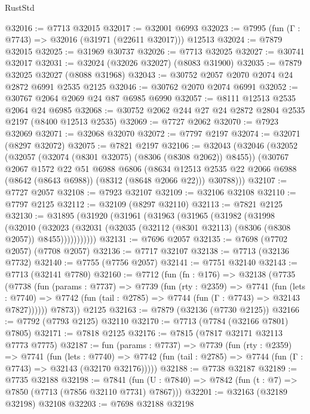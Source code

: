 \begin{lexlean}{RustStd}
\begin{coremodule}
@32016 := @7713 @32015
@32017 := @32001 @6993
@32023 := @7995 (fun (Γ : @7743) => @32016 (@31971 (@22611 @32017))) @12513
@32024 := @7879 @32015
@32025 := @31969 @30737
@32026 := @7713 @32025
@32027 := @30741 @32017
@32031 := @32024 (@32026 @32027) (@8083 @31900)
@32035 := @7879 @32025 @32027 (@8088 @31968)
@32043 := @30752 @2057 @2070 @2074 @24 @2872 @6991 @2535 @2125
@32046 := @30762 @2070 @2074 @6991
@32052 := @30767 @2064 @2069 @24 @87 @6985 @6990
@32057 := @8111 @12513 @2535 @2064 @24 @6985
@32068 := @30752 @2062 @244 @27 @24 @2872 @2804 @2535 @2197 (@8400 @12513 @2535)
@32069 := @7727 @2062
@32070 := @7923 @32069
@32071 := @32068 @32070
@32072 := @7797 @2197
@32074 := @32071 (@8297 @32072)
@32075 := @7821 @2197
@32106 := @32043
    (@32046
      (@32052
        (@32057 (@32074 (@8301 @32075) (@8306 (@8308 @2062)) @8455))
        (@30767
          @2067
          @1572
          @22
          @51
          @6988
          @6806
          (@8634 @12513 @2535 @22 @2066 @6988 (@8642 (@8643 @6988)) (@8312 (@8648 @2066 @22)))
          @30788)))
@32107 := @7727 @2057
@32108 := @7923 @32107
@32109 := @32106 @32108
@32110 := @7797 @2125
@32112 := @32109 (@8297 @32110)
@32113 := @7821 @2125
@32130 := @31895
    (@31920
      (@31961
        (@31963
          (@31965
            (@31982
              (@31998
                (@32010
                  (@32023
                    (@32031 (@32035 (@32112 (@8301 @32113) (@8306 (@8308 @2057)) @8455)))))))))))
@32131 := @7696 @2057
@32135 := @7698 (@7702 @2057) (@7708 @2057)
@32136 := @7717 @32107
@32138 := @7713 (@32136 @7732)
@32140 := @7755 (@7756 @2057)
@32141 := @7751 @32140
@32143 := @7713 (@32141 @7780)
@32160 := @7712
    (fun (fn : @176) =>
    @32138
      (@7735
        (@7738
          (fun (params : @7737) =>
          @7739
            (fun (rty : @2359) =>
            @7741
              (fun (lets : @7740) =>
              @7742 (fun (tail : @2785) => @7744 (fun (Γ : @7743) => @32143 @7827))))))
        @7873))
    @2125
@32163 := @7879 (@32136 (@7730 @2125))
@32166 := @7792 (@7793 @2125) @32110
@32170 := @7713 (@7784 (@32166 @7801) @7805)
@32171 := @7818 @2125
@32176 := @7815 (@7817 @32171 @32113 @7773 @7775)
@32187 := fun (params : @7737) =>
  @7739
    (fun (rty : @2359) =>
    @7741
      (fun (lets : @7740) =>
      @7742 (fun (tail : @2785) => @7744 (fun (Γ : @7743) => @32143 (@32170 @32176)))))
@32188 := @7738 @32187
@32189 := @7735 @32188
@32198 := @7841
    (fun (U : @7840) => @7842 (fun (t : @7) => @7850 (@7713 (@7856 @32110 @7731) @7867)))
@32201 := @32163 (@32189 @32198) @32108
@32203 := @7698 @32188 @32198

\end{coremodule}
\end{lexlean}
